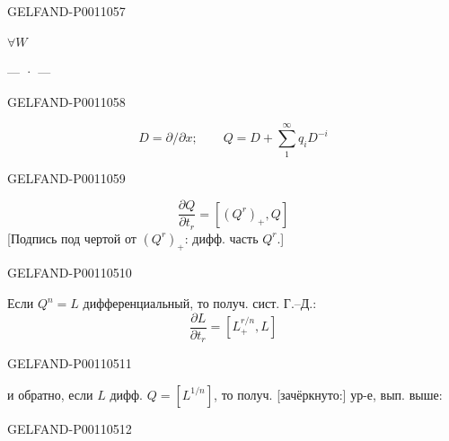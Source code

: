 \begin{GelfandAdjacentEvidence}{GELFAND-P001105}{7}


$\forall W$ 

\begin{center}— · —\end{center}
\end{GelfandAdjacentEvidence}
\begin{GelfandAdjacentEvidence}{GELFAND-P001105}{8}


\[
D=\partial/\partial x;\qquad Q=D+\sum_1^\infty q_i D^{-i}
\]
\end{GelfandAdjacentEvidence}
\begin{GelfandAdjacentEvidence}{GELFAND-P001105}{9}


\[
\frac{\partial Q}{\partial t_r}=[(Q^r)_+,Q]
\]
[Подпись под чертой от $(Q^r)_+$: дифф. часть $Q^r$.]
\end{GelfandAdjacentEvidence}
\begin{GelfandAdjacentEvidence}{GELFAND-P001105}{10}


Если $Q^n=L$ дифференциальный, то получ. сист. Г.–Д.:
\[
\frac{\partial L}{\partial t_r}=[L_+^{r/n},L]
\]
\end{GelfandAdjacentEvidence}
\begin{GelfandAdjacentEvidence}{GELFAND-P001105}{11}


и обратно, если $L$ дифф. $Q=[L^{1/n}]$, то получ. [зачёркнуто:]
ур-е, вып. выше:
\end{GelfandAdjacentEvidence}
\begin{GelfandAdjacentEvidence}{GELFAND-P001105}{12}

\end{GelfandAdjacentEvidence}
